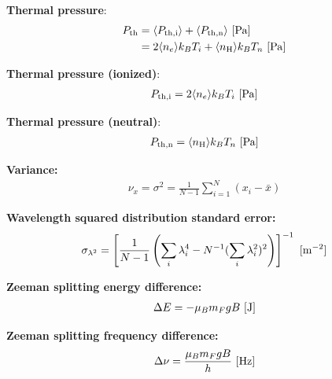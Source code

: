 \documentclass[a4paper,10pt]{article}
\begin{document}
{\noindent}\textbf{Thermal pressure}:
\begin{align*}
    P_{\rm th} &= \langle P_{\rm th,i} \rangle + \langle P_{\rm th,n} \rangle ~ [{\rm Pa}] \\
                     &= 2\langle n_e\rangle k_BT_i + \langle n_{\rm H}\rangle k_BT_n ~ [{\rm Pa}]
\end{align*}

{\noindent}\textbf{Thermal pressure (ionized)}:
\begin{align*}
    P_{\rm th,i} = 2\langle n_e\rangle k_BT_i ~ [{\rm Pa}]
\end{align*}

{\noindent}\textbf{Thermal pressure (neutral)}:
\begin{align*}
    P_{\rm th,n} = \langle n_{\rm H}\rangle k_BT_n ~ [{\rm Pa}]
\end{align*}

{\noindent}\textbf{Variance:}
\begin{align*}
    \nu_x = \sigma^2= \frac{1}{N-1} \sum_{i=1}^N (x_i-\bar{x})
\end{align*}

{\noindent}\textbf{Wavelength squared distribution standard error:} 
\begin{align*}
\sigma_{\lambda^2} = \left[ \dfrac{1}{N-1} \left( \sum_i\lambda_i^4 - N^{-1}(\sum_i\lambda_i^2)^2 \right) \right]^{-1} ~ [{\rm m^{-2}}]
\end{align*}

{\noindent}\textbf{Zeeman splitting energy difference:}
\begin{align*}
    \Delta E = -\mu_Bm_FgB ~ [{\rm J}]
\end{align*}

{\noindent}\textbf{Zeeman splitting frequency difference:}
\begin{align*}
    \Delta\nu = \frac{\mu_Bm_FgB}{h} ~ [{\rm Hz}]
\end{align*}
\end{document}
